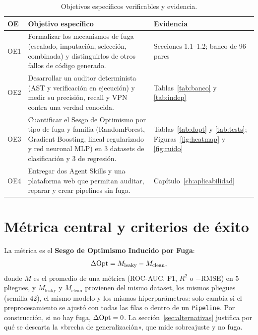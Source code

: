 \begin{table}[!htbp]
\centering
\caption{Objetivos específicos verificables y evidencia.}
\label{tab:oe}
\begingroup\footnotesize\singlespacing
\begin{tabular}{@{}l p{9.4cm} p{4.4cm}@{}}
\toprule
OE & Objetivo específico & Evidencia \\
\midrule
OE1 & Formalizar los mecanismos de fuga (escalado, imputación, selección, combinada) y distinguirlos de otros fallos de código generado. & Secciones 1.1--1.2; banco de 96 pares \\
OE2 & Desarrollar un auditor determinista (AST y verificación en ejecución) y medir su precisión, recall y VPN contra una verdad conocida. & Tablas~\ref{tab:banco} y \ref{tab:indep} \\
OE3 & Cuantificar el Sesgo de Optimismo \DOpt{} por tipo de fuga y familia (RandomForest, Gradient Boosting, lineal regularizado y red neuronal MLP) en 3 datasets de clasificación y 3 de regresión. & Tablas~\ref{tab:dopt} y \ref{tab:tests}; Figuras~\ref{fig:heatmap} y \ref{fig:ruido} \\
OE4 & Entregar dos Agent Skills y una plataforma web que permitan auditar, reparar y crear pipelines sin fuga. & Capítulo~\ref{ch:aplicabilidad} \\
\bottomrule
\end{tabular}
\endgroup
\end{table}

\section{Métrica central y criterios de éxito}

La métrica es el \textbf{Sesgo de Optimismo Inducido por Fuga}:
\begin{equation}
\Delta\mathrm{Opt} = M_{\mathrm{leaky}} - M_{\mathrm{clean}},
\end{equation}
donde $M$ es el promedio de una métrica (ROC-AUC, F1, $R^2$ o $-$RMSE) en 5 pliegues, y $M_{\mathrm{leaky}}$ y $M_{\mathrm{clean}}$ provienen del mismo dataset, los mismos pliegues (semilla 42), el mismo modelo y los mismos hiperparámetros: solo cambia si el preprocesamiento se ajustó con todas las filas o dentro de un \texttt{Pipeline}. Por construcción, si no hay fuga, $\Delta\mathrm{Opt}=0$. La sección~\ref{sec:alternativas} justifica por qué se descarta la «brecha de generalización», que mide sobreajuste y no fuga.

